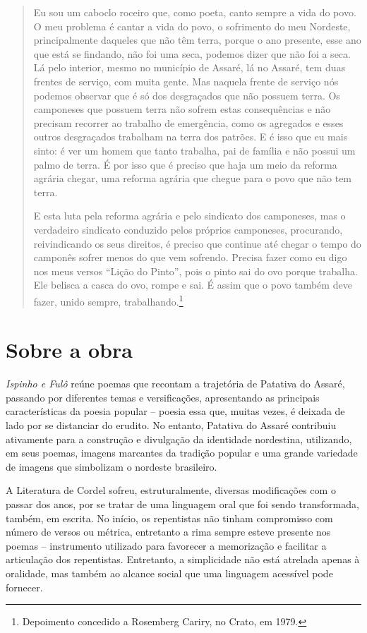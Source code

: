 \begin{quote}
Eu sou um caboclo roceiro que, como poeta, canto sempre a vida do
povo. O meu problema é cantar a vida do povo, o sofrimento do meu
Nordeste, principalmente daqueles que não têm terra, porque o ano
presente, esse ano que está se findando, não foi uma seca, podemos dizer
que não foi a seca. Lá pelo interior, mesmo no município de Assaré, lá
no Assaré, tem duas frentes de serviço, com muita gente. Mas naquela
frente de serviço nós podemos observar que é só dos desgraçados que
não possuem terra. Os camponeses que possuem terra não sofrem estas
consequências e não precisam recorrer ao trabalho de emergência, como
os agregados e esses outros desgraçados trabalham na terra dos patrões.
E é isso que eu mais sinto: é ver um homem que tanto trabalha, pai de
família e não possui um palmo de terra. É por isso que é preciso que
haja um meio da reforma agrária chegar, uma reforma agrária que chegue para o povo que não tem terra.

E esta luta pela reforma agrária e pelo sindicato dos camponeses, mas o
verdadeiro sindicato conduzido pelos próprios camponeses, procurando,
reivindicando os seus direitos, é preciso que continue até chegar o
tempo do camponês sofrer menos do que vem sofrendo. Precisa fazer como
eu digo nos meus versos ``Lição do Pinto'', pois o pinto sai do ovo
porque trabalha. Ele belisca a casca do ovo, rompe e sai. É assim que o
povo também deve fazer, unido sempre, trabalhando.\footnote{Depoimento concedido a Rosemberg
Cariry, no Crato, em 1979.}
\end{quote}

\section{Sobre a obra}

\emph{Ispinho e Fulô} reúne poemas que recontam a trajetória de Patativa
do Assaré, passando por diferentes temas e versificações, apresentando
as principais características da poesia popular -- poesia essa que,
muitas vezes, é deixada de lado por se distanciar do erudito. No
entanto, Patativa do Assaré contribuiu ativamente para a construção e
divulgação da identidade nordestina, utilizando, em seus poemas, imagens
marcantes da tradição popular e uma grande variedade de imagens que
simbolizam o nordeste brasileiro.

A Literatura de Cordel sofreu, estruturalmente, diversas modificações
com o passar dos anos, por se tratar de uma linguagem oral que foi sendo
transformada, também, em escrita. No início, os repentistas não tinham
compromisso com número de versos ou métrica, entretanto a rima sempre
esteve presente nos poemas -- instrumento utilizado para favorecer a
memorização e facilitar a articulação dos repentistas. Entretanto, a
simplicidade não está atrelada apenas à oralidade, mas também ao alcance
social que uma linguagem acessível pode fornecer.

